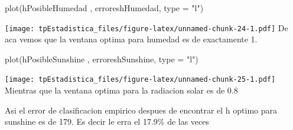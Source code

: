 \documentclass[
]{article}
\newenvironment{Shaded}{\begin{snugshade}}{\end{snugshade}}
\newcommand{\AttributeTok}[1]{\textcolor[rgb]{0.77,0.63,0.00}{#1}}
\newcommand{\FunctionTok}[1]{\textcolor[rgb]{0.00,0.00,0.00}{#1}}
\newcommand{\NormalTok}[1]{#1}
\newcommand{\StringTok}[1]{\textcolor[rgb]{0.31,0.60,0.02}{#1}}
\begin{document}
\begin{Shaded}
\begin{Highlighting}[]
\FunctionTok{plot}\NormalTok{(hPosibleHumedad , erroreshHumedad, }\AttributeTok{type =} \StringTok{"l"}\NormalTok{)}
\end{Highlighting}
\end{Shaded}

\texttt{[image: tpEstadistica\_files/figure-latex/unnamed-chunk-24-1.pdf]}
De aca vemos que la ventana optima para humedad es de exactamente 1.

\begin{Shaded}
\begin{Highlighting}[]
\FunctionTok{plot}\NormalTok{(hPosibleSunshine , erroreshSunshine, }\AttributeTok{type =} \StringTok{"l"}\NormalTok{)}
\end{Highlighting}
\end{Shaded}

\texttt{[image: tpEstadistica\_files/figure-latex/unnamed-chunk-25-1.pdf]}
Mientras que la ventana optima para la radiacion solar es de 0.8

Asi el error de clasificacion empirico despues de encontrar el h optimo
para sunshine es de 179. Es decir le erra el 17.9\% de las veces
\end{document}
